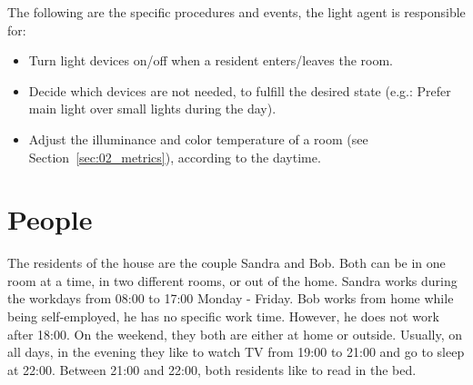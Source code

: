 \documentclass[letterpaper, 11pt]{Proposal}
\def\Sec#1{Section~\ref{#1}}
\begin{document}
The following are the specific procedures and events, the light agent is responsible for:
\begin{itemize}
    \item Turn light devices on/off when a resident enters/leaves the room.
    \item Decide which devices are not needed, to fulfill the desired state 
    (e.g.: Prefer main light over small lights during the day).
    \item Adjust the illuminance and color temperature of a room 
    (see \Sec{sec:02_metrics}), according to the daytime.
\end{itemize}

\section{People}\label{sec:06_people}
The residents of the house are the couple Sandra and Bob. 
Both can be in one room at a time, 
in two different rooms, or out of the home. 
Sandra works during the workdays from 08:00 to 17:00 Monday - Friday. 
Bob works from home while being self-employed, 
he has no specific work time. 
However, he does not work after 18:00.
On the weekend, they both are either at home or outside. 
Usually, on all days, in the evening they like to watch TV 
from 19:00 to 21:00 and go to sleep at 22:00.
Between 21:00 and 22:00, both residents like to read in the bed.



\end{document}
